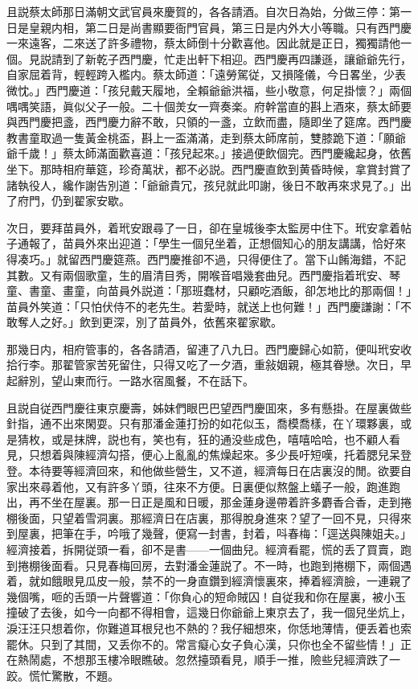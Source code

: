 且説蔡太師那日滿朝文武官員來慶賀的，各各請酒。自次日為始，分做三停：第一日是皇親内相，第二日是尚書顯要衙門官員，第三日是内外大小等職。只有西門慶一來遠客，二來送了許多禮物，蔡太師倒十分歡喜他。因此就是正日，獨獨請他一個。見説請到了新乾子西門慶，忙走出軒下相迎。西門慶再四謙遜，讓爺爺先行，自家屈着背，輕輕跨入檻内。蔡太師道：「遠勞駕従，又損隆儀，今日畧坐，少表微忱。」西門慶道：「孩兒戴天履地，全賴爺爺洪福，些小敬意，何足掛懷？」兩個喁喁笑語，眞似父子一般。二十個羙女一齊奏楽。府幹當直的斟上酒來，蔡太師要與西門慶把盞，西門慶力辭不敢，只領的一盞，立飲而盡，隨即坐了筵席。西門慶教書童取過一隻黃金桃盃，斟上一盃滿滿，走到蔡太師席前，雙膝跪下道：「願爺爺千歲！」蔡太師滿面歡喜道：「孩兒起來。」接過便飲個完。西門慶纔起身，依舊坐下。那時相府華筵，珍奇萬狀，都不必説。西門慶直飲到黄昏時候，拿賞封賞了諸執役人，纔作謝告別道：「爺爺貴冗，孩兒就此叩謝，後日不敢再來求見了。」出了府門，仍到翟家安歇。

次日，要拜苗員外，着玳安跟尋了一日，卻在皇城後李太監房中住下。玳安拿着帖子通報了，苗員外來出迎道：「學生一個兒坐着，正想個知心的朋友講講，恰好來得凑巧。」就留西門慶筵燕。西門慶推卻不過，只得便住了。當下山餚海錯，不記其數。又有兩個歌童，生的眉清目秀，開喉音唱幾套曲兒。西門慶指着玳安、琴童、書童、畫童，向苗員外説道：「那班蠢材，只顧吃酒飯，卻怎地比的那兩個！」苗員外笑道：「只怕伏侍不的老先生。若愛時，就送上也何難！」西門慶謙謝：「不敢奪人之好。」飲到更深，別了苗員外，依舊來翟家歇。

那幾日内，相府管事的，各各請酒，留連了八九日。西門慶歸心如箭，便叫玳安收拾行李。那翟管家苦死留住，只得又吃了一夕酒，重敍姻親，極其眷戀。次日，早起辭別，望山東而行。一路水宿風餐，不在話下。

且説自従西門慶往東京慶壽，姊妹們眼巴巴望西門慶囬來，多有懸掛。在屋裏做些針指，通不出來閑耍。只有那潘金蓮打扮的如花似玉，喬模喬樣，在丫環夥裏，或是猜枚，或是抹牌，説也有，笑也有，狂的通没些成色，嘻嘻哈哈，也不顧人看見，只想着與陳經濟勾搭，便心上亂亂的焦燥起來。多少長吁短嘆，托着腮兒呆登登。本待要等經濟回來，和他做些營生，又不道，經濟每日在店裏沒的閒。欲要自家出來尋着他，又有許多丫頭，往來不方便。日裏便似熬盤上蟻子一般，跑進跑出，再不坐在屋裏。那一日正是風和日暖，那金蓮身邊帶着許多麝香合香，走到捲棚後面，只望着雪洞裏。那經濟日在店裏，那得脫身進來？望了一回不見，只得來到屋裏，把筆在手，吟哦了幾聲，便寫一封書，封着，呌春梅：「逕送與陳姐夫。」經濟接着，拆開従頭一看，卻不是書——一個曲兒。經濟看罷，慌的丢了買賣，跑到捲棚後面看。只見春梅回房，去對潘金蓮説了。不一時，也跑到捲棚下，兩個遇着，就如餓眼見瓜皮一般，禁不的一身直鑽到經濟懷裏來，捧着經濟臉，一連親了幾個嘴，咂的舌頭一片聲響道：「你負心的短命賊囚！自従我和你在屋裏，被小玉撞破了去後，如今一向都不得相會，這幾日你爺爺上東京去了，我一個兒坐炕上，淚汪汪只想着你，你難道耳根兒也不熱的？我仔細想來，你恁地薄情，便丢着也索罷休。只到了其間，又丢你不的。常言癡心女子負心漢，只你也全不留些情！」正在熱鬧處，不想那玉樓冷眼瞧破。忽然擡頭看見，順手一推，險些兒經濟跌了一跤。慌忙驚散，不題。

